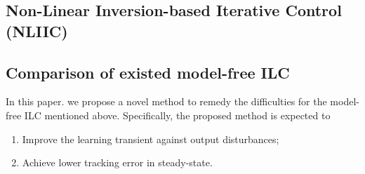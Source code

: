 \subsection{Non-Linear Inversion-based Iterative Control (NLIIC)}
\label{sec: Non-Linear Inversion-based Iterative Control (NLIIC)}

\subsection{Comparison of existed model-free ILC}
\label{sec: Comparison of existed model-free ILC}

In this paper. we propose a novel method to remedy the difficulties for the model-free ILC mentioned above. Specifically, the proposed method is expected to
\begin{enumerate}
  \item Improve the learning transient against output disturbances;
  \item Achieve lower tracking error in steady-state.
\end{enumerate}